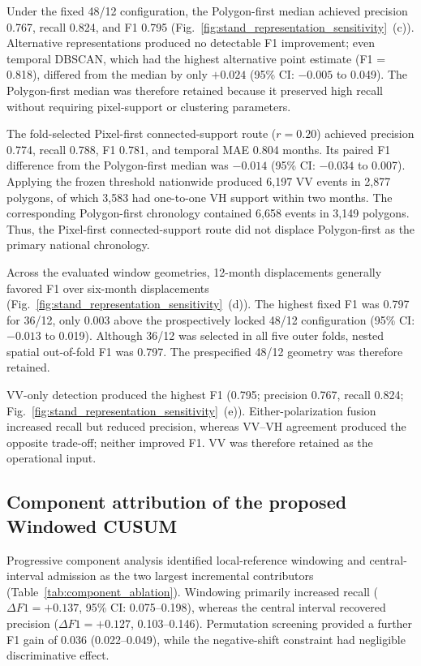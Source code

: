 Under the fixed 48/12 configuration, the Polygon-first median achieved precision 0.767, recall 0.824, and F1 0.795 (Fig.~\ref{fig:stand_representation_sensitivity}~(c)). Alternative representations produced no detectable F1 improvement; even temporal DBSCAN, which had the highest alternative point estimate (F1 = 0.818), differed from the median by only $+0.024$ (95\% CI: $-0.005$ to 0.049). The Polygon-first median was therefore retained because it preserved high recall without requiring pixel-support or clustering parameters.

The fold-selected Pixel-first connected-support route ($r=0.20$) achieved precision 0.774, recall 0.788, F1 0.781, and temporal MAE 0.804 months. Its paired F1 difference from the Polygon-first median was $-0.014$ (95\% CI: $-0.034$ to 0.007). Applying the frozen threshold nationwide produced 6,197 VV events in 2,877 polygons, of which 3,583 had one-to-one VH support within two months. The corresponding Polygon-first chronology contained 6,658 events in 3,149 polygons. Thus, the Pixel-first connected-support route did not displace Polygon-first as the primary national chronology.


Across the evaluated window geometries, 12-month displacements generally favored F1 over six-month displacements (Fig.~\ref{fig:stand_representation_sensitivity}~(d)). The highest fixed F1 was 0.797 for 36/12, only 0.003 above the prospectively locked 48/12 configuration (95\% CI: $-0.013$ to 0.019). Although 36/12 was selected in all five outer folds, nested spatial out-of-fold F1 was 0.797. The prespecified 48/12 geometry was therefore retained.



VV-only detection produced the highest F1 (0.795; precision 0.767, recall 0.824; Fig.~\ref{fig:stand_representation_sensitivity}~(e)). Either-polarization fusion increased recall but reduced precision, whereas VV--VH agreement produced the opposite trade-off; neither improved F1. VV was therefore retained as the operational input.



\subsection{Component attribution of the proposed Windowed CUSUM}
\label{sec:representation_component_ablation}


Progressive component analysis identified local-reference windowing and central-interval admission as the two largest incremental contributors (Table~\ref{tab:component_ablation}). Windowing primarily increased recall ($\Delta F1=+0.137$, 95\% CI: 0.075--0.198), whereas the central interval recovered precision ($\Delta F1=+0.127$, 0.103--0.146). Permutation screening provided a further F1 gain of 0.036 (0.022--0.049), while the negative-shift constraint had negligible discriminative effect.


